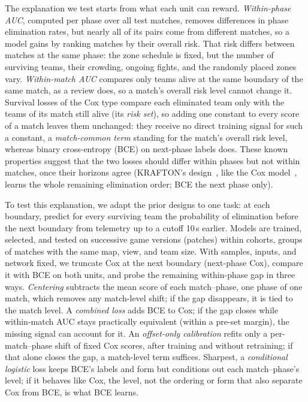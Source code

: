 \documentclass[sigconf,anonymous]{acmart}
\begin{document}
The explanation we test starts from what each unit can reward. \emph{Within-phase AUC}, computed per phase over all test matches, removes differences in phase elimination rates, but nearly all of its pairs come from different matches, so a model gains by ranking matches by their overall risk. That risk differs between matches at the same phase: the zone schedule is fixed, but the number of surviving teams, their crowding, ongoing fights, and the randomly placed zones vary. \emph{Within-match AUC} compares only teams alive at the same boundary of the same match, as a review does, so a match's overall risk level cannot change it. Survival losses of the Cox type compare each eliminated team only with the teams of its match still alive (its \emph{risk set}), so adding one constant to every score of a match leaves them unchanged: they receive no direct training signal for such a constant, a \emph{match-common term} standing for the match's overall risk level, whereas binary cross-entropy (BCE) on next-phase labels does. These known properties suggest that the two losses should differ within phases but not within matches, once their horizons agree (KRAFTON's design~\cite{KRAFTON}, like the Cox model~\cite{Cox72}, learns the whole remaining elimination order; BCE the next phase only).

To test this explanation, we adapt the prior designs to one task: at each boundary, predict for every surviving team the probability of elimination before the next boundary from telemetry up to a cutoff 10\,s earlier. Models are trained, selected, and tested on successive game versions (patches) within cohorts, groups of matches with the same map, view, and team size. With samples, inputs, and network fixed, we truncate Cox at the next boundary (next-phase Cox), compare it with BCE on both units, and probe the remaining within-phase gap in three ways. \emph{Centering} subtracts the mean score of each match--phase, one phase of one match, which removes any match-level shift; if the gap disappears, it is tied to the match level. A \emph{combined loss} adds BCE to Cox; if the gap closes while within-match AUC stays practically equivalent (within a pre-set margin), the missing signal can account for it. An \emph{offset-only calibration} refits only a per-match--phase shift of fixed Cox scores, after training and without retraining; if that alone closes the gap, a match-level term suffices. Sharpest, a \emph{conditional logistic} loss keeps BCE's labels and form but conditions out each match--phase's level; if it behaves like Cox, the level, not the ordering or form that also separate Cox from BCE, is what BCE learns.
\end{document}

